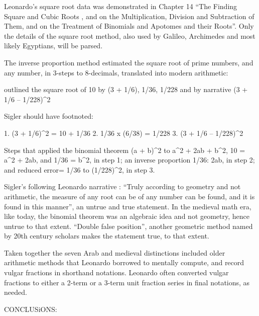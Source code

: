 \documentclass[12pt]{article}
\begin{document}
Leonardo’s square root data was demonstrated in Chapter 14 “The Finding Square and Cubic Roots , and on the  Multiplication, Division and Subtraction of Them, and on the Treatment of Binomials and Apotomes and their Roots”. Only the details of the square root method, also used by Galileo, Archimedes and most likely Egyptians, will be parsed. 

The inverse proportion method estimated the square root of prime numbers, and any number, in 3-steps to 8-decimals, translated into modern arithmetic:

 outlined the square root of 10 by (3 + 1/6), 1/36, 1/228 and by narrative (3 + 1/6 – 1/228)^2

Sigler should have footnoted:

1.	(3 + 1/6)^2 = 10 + 1/36
2.	1/36 x (6/38) = 1/228
3.	(3 + 1/6 – 1/228)^2 

Steps that applied the binomial theorem (a + b)^2  to a^2 + 2ab + b^2,  10 = a^2 + 2ab, and 1/36 = b^2, in step 1; an inverse proportion 1/36: 2ab, in step 2; and reduced error=  1/36 to (1/228)^2, in step 3.

Sigler’s following Leonardo narrative : “Truly according to geometry and not arithmetic, the measure of any root can be of any number can be found, and it is found in this manner”, an untrue and true statement.  In the medieval math era, like today, the binomial theorem was an algebraic idea and not geometry, hence untrue to that extent. “Double false position”, another geometric method named by 20th century scholars makes the statement true, to that extent.

Taken together the seven Arab and medieval distinctions included older arithmetic methods that Leonardo borrowed to mentally compute, and record vulgar fractions in shorthand notations. Leonardo often converted vulgar fractions to either a  2-term or  a 3-term unit fraction series in final notations, as needed. 

CONCLUSiONS:
\end{document}
